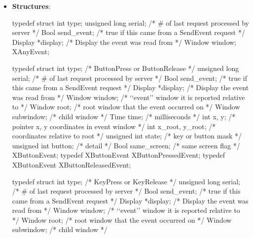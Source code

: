 \documentclass{report}
\begin{document}
\begin{itemize}
        \item \textbf{Structures}:
            \begin{cppcode}
                typedef struct {
                    int type;
                    unsigned long serial;   /* # of last request processed by server */
                    Bool send_event;        /* true if this came from a SendEvent request */
                    Display *display;       /* Display the event was read from */
                    Window window;
                } XAnyEvent;
            \end{cppcode}
            \begin{cppcode}
                typedef struct {
                    int type;               /* ButtonPress or ButtonRelease */
                    unsigned long serial;   /* # of last request processed by server */
                    Bool send_event;        /* true if this came from a SendEvent request */
                    Display *display;       /* Display the event was read from */
                    Window window;          /* ‘‘event’’ window it is reported relative to */
                    Window root;            /* root window that the event occurred on */
                    Window subwindow;       /* child window */
                    Time time;              /* milliseconds */
                    int x, y;               /* pointer x, y coordinates in event window */
                    int x_root, y_root;     /* coordinates relative to root */
                    unsigned int state;     /* key or button mask */
                    unsigned int button;    /* detail */
                    Bool same_screen;       /* same screen flag */
                } XButtonEvent;
                typedef XButtonEvent XButtonPressedEvent;
                typedef XButtonEvent XButtonReleasedEvent; 
            \end{cppcode}
            \begin{cppcode}
                typedef struct {
                    int type;               /* KeyPress or KeyRelease */
                    unsigned long serial;   /* # of last request processed by server */
                    Bool send_event;        /* true if this came from a SendEvent request */
                    Display *display;       /* Display the event was read from */
                    Window window;          /* ‘‘event’’ window it is reported relative to */
                    Window root;            /* root window that the event occurred on */
                    Window subwindow;       /* child window */
}
\end{cppcode}
\end{itemize}
\end{document}
